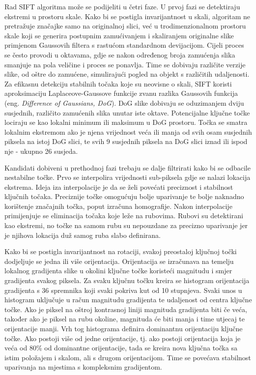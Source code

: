 Rad SIFT algoritma može se podijeliti u četri faze. U prvoj fazi se detektiraju ekstremi u prostoru skale. Kako bi se postigla invarijantnost u skali, algoritam ne pretražuje značajke samo na originalnoj slici, već u trodimenzionalnom prostoru skale koji se generira postupnim zamućivanjem i skaliranjem originalne slike primjenom Gaussovih filtera s rastućom standardnom devijacijom. 
Cijeli proces se često provodi u oktavama, gdje se nakon određenog broja zamućenja slika smanjuje na pola veličine i proces se ponavlja. Time se dobivaju različite verzije slike, od oštre do zamućene, simulirajući pogled na objekt s različitih udaljenosti. Za efikasnu detekciju stabilnih točaka koje su neovisne o skali, SIFT koristi aproksimaciju Laplaceove-Gaussove funkcije zvanu razlika Gaussovih funkcija (eng. \textit{Difference of Gaussians, DoG}). DoG slike dobivaju se oduzimanjem dviju susjednih, različito zamućenih slika unutar iste oktave. Potencijalne ključne točke lociraju se kao lokalni minimum ili maksimum u DoG prostoru. Točka se smatra lokalnim ekstremom ako je njena vrijednost veća ili manja od svih osam susjednih piksela na istoj DoG slici, te svih 9 susjednih piksela na DoG slici iznad ili ispod nje - ukupno 26 susjeda.

Kandidati dobiveni u prethodnoj fazi trebaju se dalje filtrirati kako bi se odbacile nestabilne točke. Prvo se interpolira vrijednosti sub-piksela gdje se nalazi lokacija ekstrema. Ideja iza interpolacije je da se želi povećati preciznost i stabilnost ključnih točaka. Preciznije točke omogućuju bolje uparivanje te bolje naknadno korištenje značajnih točka, poput izračuna homografije. Nakon interpolacije primijenjuje se eliminacija točaka koje leže na rubovima. Rubovi su detektirani kao ekstremi, no točke na samom rubu su nepouzdane za precizno uparivanje jer je njihova lokacija duž samog ruba slabo definirana.

Kako bi se postigla invarijantnost na rotaciji, svakoj preostaloj ključnoj točki dodjeljuje se jedna ili više orijentacija. Orijentacija se izračunava na temelju lokalnog gradijenta slike u okolini ključne točke koristeći magnitudu i smjer gradijenta svakog piksela. Za svaku ključnu točku kreira se histogram orijentacija gradijenta s 36 spremnika koji svaki pokriva kut od 10 stupnjeva. 
Svaki unos u histogram uključuje u račun magnitudu gradijenta te udaljenost od centra ključne točke. Ako je piksel na oštroj kontrasnoj liniji magnituda gradijenta  biti če veća, također ako je piksel na rubu okoline, magnituda će biti manja i time utjecaj te orijentacije manji. Vrh tog histograma definira dominantnu orijentaciju ključne točke. Ako postoji više od jedne orijentacije, tj. ako postoji orijentacija koja je veća od 80\% od dominantne orijentacije, tada se kreira nova ključna točka sa istim položajem i skalom, ali s drugom orijentacijom. Time se povećava stabilnost uparivanja na mjestima s kompleksnim gradijentom.

